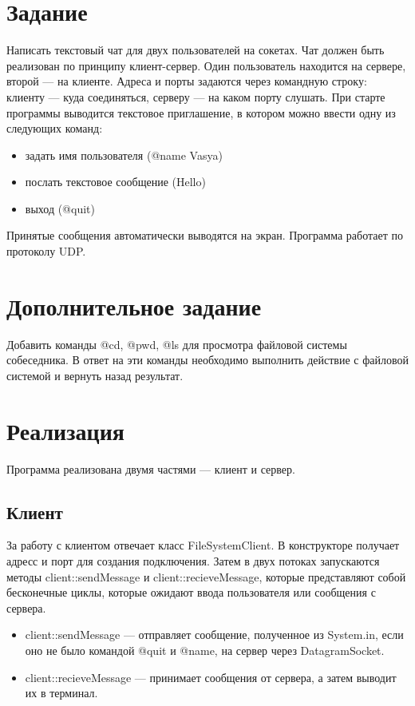 \documentclass{article}
\begin{document}
\section{Задание}
Написать текстовый чат для двух пользователей на сокетах. Чат должен быть реализован по принципу клиент-сервер. Один пользователь находится на сервере, второй --- на клиенте. Адреса и порты задаются через командную строку: клиенту --- куда соединяться, серверу --- на каком порту слушать. При старте программы выводится текстовое приглашение, в котором можно ввести одну из следующих команд:
\begin{itemize}
	\item задать имя пользователя (@name Vasya)

	\item послать текстовое сообщение (Hello)

	\item выход (@quit)
\end{itemize}

Принятые сообщения автоматически выводятся на экран. Программа работает по протоколу UDP.

\section{Дополнительное задание}
Добавить команды @cd, @pwd, @ls для просмотра файловой системы собеседника.
В ответ на эти команды необходимо выполнить действие с файловой системой и вернуть назад результат.

\section{Реализация}
Программа реализована двумя частями --- клиент и сервер. 

\subsection{Клиент}
За работу с клиентом отвечает класс FileSystemClient. В конструкторе получает адресс и порт для создания подключения. 
Затем в двух потоках запускаются методы client::sendMessage и client::recieveMessage, которые представляют собой бесконечные циклы, которые ожидают ввода пользователя или сообщения с сервера.\begin{itemize}
\item client::sendMessage --- отправляет сообщение, полученное из System.in, если оно не было командой @quit и @name, на сервер через DatagramSocket. 
\item client::recieveMessage --- принимает сообщения от сервера, а затем выводит их в терминал.
\end{itemize}
\end{document}

